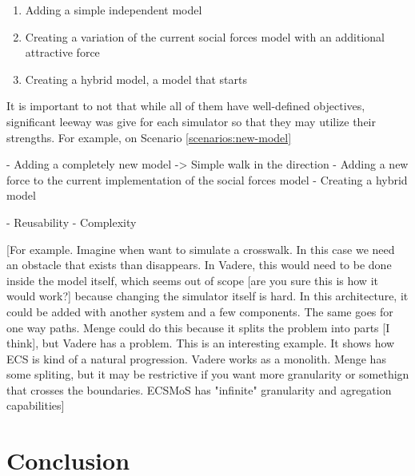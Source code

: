 \documentclass[twoside, 11pt]{article}
\begin{document}
\begin{enumerate}
  \item Adding a simple independent model \label{scenarios:new-model}
  \item Creating a variation of the current social forces model with an additional attractive force
  \item Creating a hybrid model, a model that starts 
\end{enumerate}

It is important to not that while all of them have well-defined objectives, significant leeway was give for each simulator so that they may utilize their strengths. For example, on Scenario \ref{scenarios:new-model}



- Adding a completely new model -> Simple walk in the direction
- Adding a new force to the current implementation of the social forces model
- Creating a hybrid model


- Reusability
- Complexity

[For example. Imagine when want to simulate a crosswalk. In this case we need an obstacle that exists than disappears. In Vadere, this would need to be done inside the model itself, which seems out of scope [are you sure this is how it would work?] because changing the simulator itself is hard. In this architecture, it could be added with another system and a few components. The same goes for one way paths. Menge could do this because it splits the problem into parts [I think], but Vadere has a problem. This is an interesting example. It shows how ECS is kind of a natural progression. Vadere works as a monolith. Menge has some spliting, but it may be restrictive if you want more granularity or somethign that crosses the boundaries. ECSMoS has "infinite" granularity and agregation capabilities]
\section{Conclusion}

\printbibliography
\end{document}
